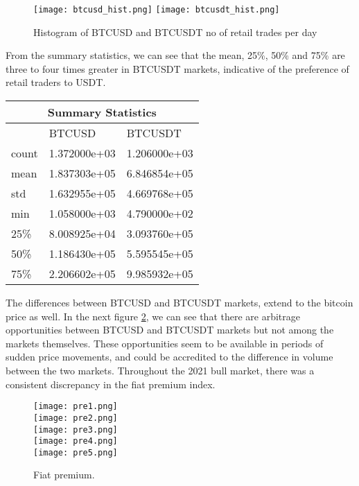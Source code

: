 \begin{figure}[H]
	\centering
    \texttt{[image: btcusd\_hist.png]}
    \texttt{[image: btcusdt\_hist.png]}
    \caption{Histogram of BTCUSD and BTCUSDT no of retail trades per day}
    \label{fig:hist}
\end{figure}

From the summary statistics, we can see that the mean, 25\%, 50\% and 75\% are three to four times greater in BTCUSDT markets, indicative of the preference of retail traders to USDT.


\begin{center}
\begin{tabular}{ |p{3cm}||p{3cm}|p{3cm}| }
 \hline
 \multicolumn{3}{|c|}{Summary Statistics} \\
 \hline
  & BTCUSD  & BTCUSDT \\
 \hline
 count   & 1.372000e+03	   &1.206000e+03 \\
 mean &   1.837303e+05	  & 6.846854e+05   \\
 std &1.632955e+05 & 4.669768e+05\\
 min    &1.058000e+03 & 4.790000e+02\\
 25\% &   8.008925e+04  & 3.093760e+05\\
 50\% & 1.186430e+05  & 5.595545e+05   \\
 75\% & 2.206602e+05  & 9.985932e+05\\
 \hline
\end{tabular}
\end{center}


The differences between BTCUSD and BTCUSDT markets, extend to the bitcoin price as well. In the next figure \ref{fig:premium}, we can see that there are arbitrage opportunities between BTCUSD and BTCUSDT markets but not among the markets themselves. These opportunities seem to be available in periods of sudden price movements, and could be accredited to the difference in volume between the two markets. Throughout the 2021 bull market, there was a consistent discrepancy in the fiat premium index.


\begin{figure}[H]
	\centering
    \texttt{[image: pre1.png]} \\
    \texttt{[image: pre2.png]} \\
    \texttt{[image: pre3.png]} \\
    \texttt{[image: pre4.png]} \\
    \texttt{[image: pre5.png]} \\
	\caption{Fiat premium.}
    \label{fig:premium}
\end{figure}



